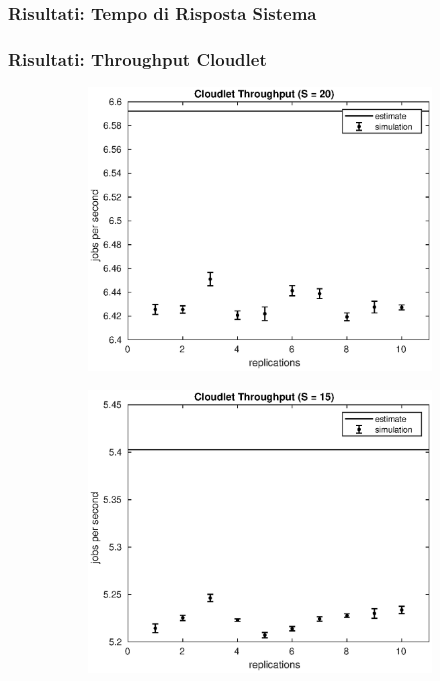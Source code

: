 \begin{frame}
\frametitle{Risultati: Tempo di Risposta Sistema}

\end{frame}
\begin{frame}
\frametitle{Risultati: Throughput Cloudlet}
%
%
\begin{figure}[!h]
\centering
%
\begin{subfigure}[t]{0.49\textwidth}
\includegraphics[width=\textwidth]{../figures/simul/20_500K_xclet}
\label{20_xclet}
\end{subfigure}
%
\begin{subfigure}[t]{0.49\textwidth}
\includegraphics[width=\textwidth]{../figures/simul/15_500K_xclet}

\end{subfigure}
\end{figure}
\end{frame}
